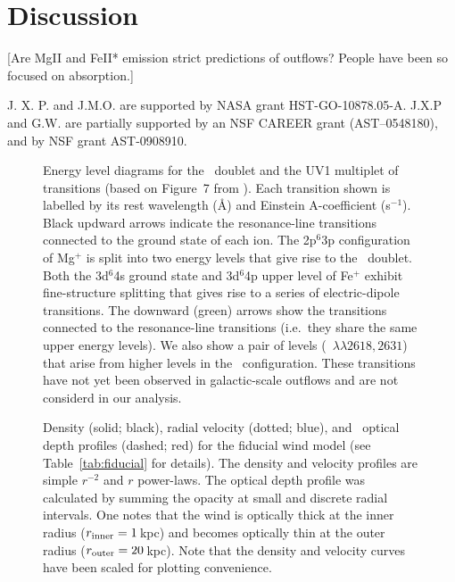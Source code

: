 \documentclass[12pt,preprint]{aastex}
\begin{document}
\section{Discussion}

[Are MgII and FeII* emission strict predictions of outflows?  People
have been so focused on absorption.]

\acknowledgments

J. X. P. and J.M.O. are supported by NASA grant
HST-GO-10878.05-A.  J.X.P and G.W. are partially supported
by an NSF CAREER grant (AST--0548180), and 
by NSF grant AST-0908910.










\begin{figure}
\caption{
Energy level diagrams for the \mgiid\ doublet and the UV1
multiplet of  transitions   
(based on Figure~7 from \cite{hmt+99}).
Each transition shown is
labelled by its rest wavelength (\AA) and Einstein A-coefficient
(s$^{-1}$). Black updward arrows
indicate the resonance-line transitions connected to the ground
state of each ion.  The 2p$^6$3p configuration of Mg$^+$ is split into
two energy levels that give rise to the \mgiid\ doublet.  
Both the 3d$^6$4s ground state and 3d$^6$4p upper level of Fe$^+$
exhibit fine-structure splitting that gives rise to a series of
electric-dipole transitions. 
The downward (green) arrows show the transitions connected to the
resonance-line transitions (i.e.\ they share the same upper energy
levels).  We also show a pair of levels (~$\lambda\lambda
2618,2631$) that arise from higher levels in the \zconfig\
configuration.  These transitions have not yet been observed in
galactic-scale outflows and are not considerd in our analysis.
}
\label{fig:energy}
\end{figure}

\begin{figure}
\caption{
Density (solid; black), radial velocity (dotted; blue), and
\mgiia\ optical depth profiles (dashed; red) for the fiducial
wind model (see Table~\ref{tab:fiducial} for details).
The density and velocity profiles are simple $r^{-2}$ and $r$
power-laws.  The optical depth profile was calculated by summing
the opacity at small and discrete radial intervals.  One notes that
the wind is optically thick at the inner radius ($r_{\rm inner} =
1$\,kpc) and becomes optically thin at the outer radius ($r_{\rm
  outer} = 20$\,kpc).
Note that the density and velocity curves have been scaled for plotting
convenience.  
}
\label{fig:fiducial_nvt}
\end{figure}
\end{document}

